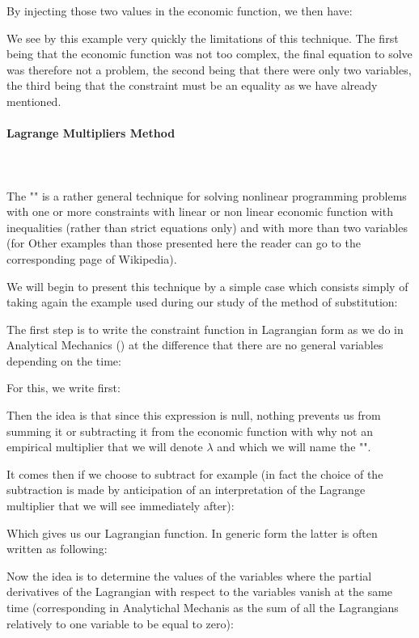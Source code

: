  	By injecting those two values in the economic function, we then have:
	
	We see by this example very quickly the limitations of this technique. The first being that the economic function was not too complex, the final equation to solve was therefore not a problem, the second being that there were only two variables, the third being that the constraint must be an equality as we have already mentioned.
	
	
	\paragraph{Lagrange Multipliers Method}\mbox{}\\\\	
	The "" is a rather general technique for solving nonlinear programming problems with one or more constraints with linear or non linear economic function with inequalities (rather than strict equations only) and with more than two variables (for Other examples than those presented here the reader can go to the corresponding page of Wikipedia).

	We will begin to present this technique by a simple case which consists simply of taking again the example used during our study of the method of substitution:
	
	The first step is to write the constraint function in Lagrangian form as we do in Analytical Mechanics () at the difference that there are no general variables depending on the time:
	
	For this, we write first:
	
	Then the idea is that since this expression is null, nothing prevents us from summing it or subtracting it from the economic function with why not an empirical multiplier that we will denote $\lambda$ and which we will name the "".

	It comes then if we choose to subtract for example (in fact the choice of the subtraction is made by anticipation of an interpretation of the Lagrange multiplier that we will see immediately after):
	
	Which gives us our Lagrangian function. In generic form the latter is often written as following:
	
 	Now the idea is to determine the values of the variables where the partial derivatives of the Lagrangian with respect to the variables vanish at the same time (corresponding in Analytichal Mechanis as the sum of all the Lagrangians relatively to one variable to be equal to zero):
	
